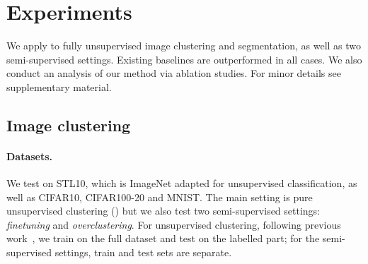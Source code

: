 \section{Experiments}\label{s:experiments}



We apply \methodnameshort to fully unsupervised image clustering and segmentation, as well as two semi-supervised settings. Existing baselines are outperformed in all cases.
We also conduct an analysis of our method via ablation studies. For minor details see supplementary material.

\subsection{Image clustering}\label{s:exp_img_clus}


%
%
%
%
%

\paragraph{Datasets.}

We test on STL10, which is ImageNet adapted for unsupervised classification, as well as CIFAR10, CIFAR100-20 and MNIST. The main setting is pure unsupervised clustering (\methodnameshort) but we also test two semi-supervised settings: \emph{finetuning} and \emph{overclustering}.
For unsupervised clustering, following previous work~\cite{chang2017deep,xie2016unsupervised,yang2016joint}, we train on the full dataset and test on the labelled part; for the semi-supervised settings, train and test sets are separate.


